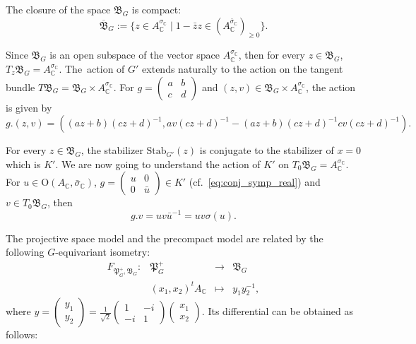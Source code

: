 \documentclass[oneside,11pt]{amsart}
\theoremstyle{definition}
\theoremstyle{remark}
\numberwithin{thm}{section}
\numberwithin{equation}{section}
\begin{document}
The closure of the space $\mathfrak{B}_G$ is compact:
$$\overline{\mathfrak{B}}_G:=\{z\in A^{\sigma_\mathbb C}_\mathbb C\mid 1-\bar zz\in (A^{\bar\sigma_\mathbb C}_\mathbb  C)_{\geq 0}\}.$$


Since $\mathfrak{B}_G$ is an open subspace of the vector space $A_\mathbb{C}^{\sigma_\mathbb{C}}$, then for every $z\in \mathfrak{B}_G$, $T_z\mathfrak{B}_G = A_\mathbb{C}^{\sigma_\mathbb{C}}$.  The~action of $G'$ extends naturally to the action on the tangent bundle $T\mathfrak{B}_G=\mathfrak{B}_G\times A^{\sigma_\mathbb C}_\mathbb C$. For 
    $g=\begin{pmatrix}
        a & b \\
        c & d
    \end{pmatrix}$
and $(z,v)\in \mathfrak{B}_G\times A^{\sigma_\mathbb C}_\mathbb C$, the action is given by
$$g.(z,v)=\left((az+b)(cz+d)^{-1}, av(cz+d)^{-1}-(az+b)(cz+d)^{-1}cv(cz+d)^{-1}\right).$$

For every $z\in\mathfrak B_G$, the stabilizer $\mathrm{Stab}_{G'}(z)$ is conjugate to the stabilizer of $x=0$ which is $K'$. We are now going to understand the action of $K'$ on $T_0\mathfrak B_G= A_\mathbb{C}^{\sigma_\mathbb{C}}$. For $u\in \mathrm O(A_\mathbb C,\bar\sigma_\mathbb C)$,
    $g=\begin{pmatrix}
        u & 0 \\
        0 & \bar u
    \end{pmatrix}\in K'$ 
(cf.~\eqref{eq:conj_symp_real}) and $v\in T_0\mathfrak B_G$, then
$$g.v=uv\bar u^{-1}=uv\sigma(u).$$

The projective space model and the precompact model are related by the following $G$-equivariant isometry: 
$$\begin{matrix}
F_{\mathfrak{P}_G^+,\mathfrak{B}_G} \colon & \mathfrak{P}_G^+ & \to & \mathfrak{B}_G\\
 & (x_1,x_2)^tA_\mathbb C & \mapsto & y_1y_2^{-1},
\end{matrix}$$
where $y=\begin{pmatrix}y_1 \\y_2\end{pmatrix}=\frac{1}{\sqrt{2}}\begin{pmatrix}
1 & -i \\
-i & 1
\end{pmatrix}\begin{pmatrix}x_1 \\x_2\end{pmatrix}$. Its differential can be obtained as follows:
\end{document}
